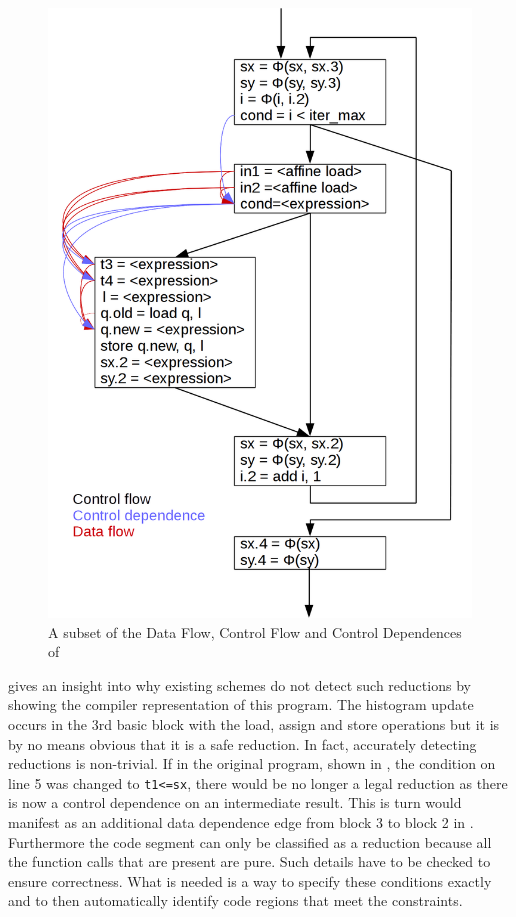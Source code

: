 \begin{figure}[p]
\centering
\includegraphics[width=\textwidth]{figures/nicepicture2.png}
\caption{A subset of the Data Flow, Control Flow and Control Dependences of
         }
\label{nice-picture2}
\end{figure}

     gives an insight into why existing schemes do not
    detect such reductions by showing the compiler representation of this 
    program.
    The histogram update occurs in the 3rd basic block with the load, assign and
    store operations but it is by no means obvious that it is a safe reduction.
    In fact, accurately detecting reductions is non-trivial.
    If in the original program, shown in , the
    condition on line 5 was changed to {\tt t1<=sx}, there would be no longer a
    legal reduction as there is now a control dependence on an intermediate
    result.
    This is turn would manifest as an additional data dependence edge from
    block 3 to block 2 in .
    Furthermore the code segment can only be classified as a reduction because
    all the function calls that are present are pure.
    Such details have to be checked to ensure correctness.
    What is needed is a way to specify these conditions exactly and to then
    automatically identify code regions that meet the constraints.

